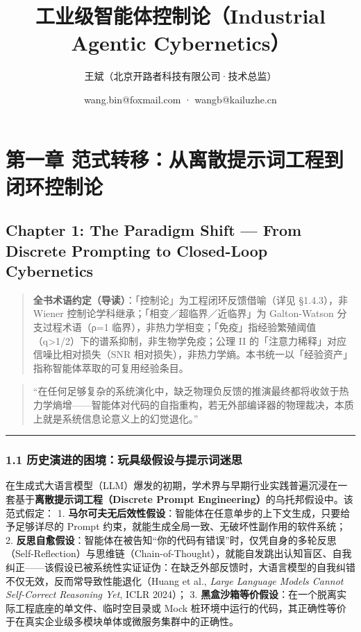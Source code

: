 \documentclass[
]{ctexart}
\title{工业级智能体控制论（Industrial Agentic Cybernetics）}
\author{王斌（北京开路者科技有限公司·技术总监） \and wang.bin@foxmail.com
· wangb@kailuzhe.cn}
\date{}
\renewcommand{\_}{\discretionary{}{}{\textunderscore}}
\let\oldsection\section
\renewcommand{\section}{\clearpage\oldsection}
\begin{document}
\maketitle

{
\setcounter{tocdepth}{4}
\tableofcontents
}
\section{第一章
范式转移：从离散提示词工程到闭环控制论}\label{ux7b2cux4e00ux7ae0-ux8303ux5f0fux8f6cux79fbux4eceux79bbux6563ux63d0ux793aux8bcdux5de5ux7a0bux5230ux95edux73afux63a7ux5236ux8bba}

\subsection{Chapter 1: The Paradigm Shift --- From Discrete Prompting to
Closed-Loop
Cybernetics}\label{chapter-1-the-paradigm-shift-from-discrete-prompting-to-closed-loop-cybernetics}

\begin{quote}
\textbf{全书术语约定（导读）}：「控制论」为工程闭环反馈借喻（详见
§1.4.3），非 Wiener 控制论学科继承；「相变／超临界／近临界」为
Galton-Watson 分支过程术语（ρ=1
临界），非热力学相变；「免疫」指经验繁殖阈值（q\textgreater1/2）下的谱系抑制，非生物学免疫；公理
II 的「注意力稀释」对应信噪比相对损失（SNR
相对损失），非热力学熵。本书统一以「经验资产」指称智能体萃取的可复用经验条目。
\end{quote}

\begin{quote}
``在任何足够复杂的系统演化中，缺乏物理负反馈的推演最终都将收敛于热力学熵增------智能体对代码的自指重构，若无外部编译器的物理裁决，本质上就是系统信息论意义上的幻觉退化。''
\end{quote}

\begin{center}\rule{0.5\linewidth}{0.5pt}\end{center}

\subsubsection{1.1
历史演进的困境：玩具级假设与提示词迷思}\label{ux5386ux53f2ux6f14ux8fdbux7684ux56f0ux5883ux73a9ux5177ux7ea7ux5047ux8bbeux4e0eux63d0ux793aux8bcdux8ff7ux601d}

在生成式大语言模型（LLM）爆发的初期，学术界与早期行业实践普遍沉浸在一套基于\textbf{离散提示词工程（Discrete
Prompt Engineering）}的乌托邦假设中。该范式假定： 1.
\textbf{马尔可夫无后效性假设}：智能体在任意单步的上下文生成，只要给予足够详尽的
Prompt 约束，就能生成全局一致、无破坏性副作用的软件系统； 2.
\textbf{反思自愈假设}：智能体在被告知``你的代码有错误''时，仅凭自身的多轮反思（Self-Reflection）与思维链（Chain-of-Thought），就能自发跳出认知盲区、自我纠正------该假设已被系统性实证证伪：在缺乏外部反馈时，大语言模型的自我纠错不仅无效，反而常导致性能退化（Huang
et al., \emph{Large Language Models Cannot Self-Correct Reasoning Yet},
ICLR 2024）； 3.
\textbf{黑盒沙箱等价假设}：在一个脱离实际工程底座的单文件、临时空目录或
Mock
桩环境中运行的代码，其正确性等价于在真实企业级多模块单体或微服务集群中的正确性。
\end{document}
